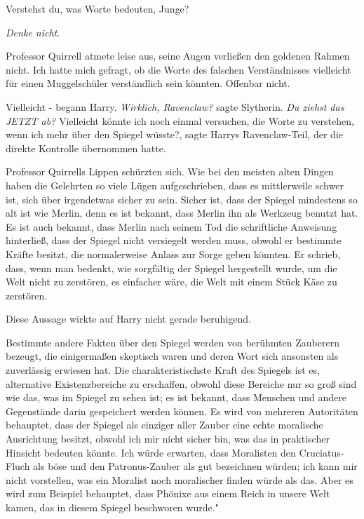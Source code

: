 \glqq{}Verstehst du, was Worte bedeuten, Junge?\grqq{}

\glqq{}\emph{Denke nicht}.\grqq{}

Professor Quirrell atmete leise aus, seine Augen verließen den goldenen Rahmen
nicht. \glqq{}Ich hatte mich gefragt, ob die Worte des falschen Verständnisses
vielleicht für einen Muggelschüler verständlich sein könnten. Offenbar
nicht.\grqq{}

\glqq{}Vielleicht -\grqq{} begann Harry. \emph{Wirklich, Ravenclaw?} sagte
Slytherin. \emph{Du ziehst das JETZT ab?} \glqq{}Vielleicht könnte ich noch
einmal versuchen, die Worte zu verstehen, wenn ich mehr über den Spiegel
wüsste?\grqq{}, sagte Harrys Ravenclaw-Teil, der die direkte Kontrolle
übernommen hatte.

Professor Quirrells Lippen schürzten sich. \glqq{}Wie bei den meisten alten
Dingen haben die Gelehrten so viele Lügen aufgeschrieben, dass es mittlerweile
schwer ist, sich über irgendetwas sicher zu sein. Sicher ist, dass der Spiegel
mindestens so alt ist wie Merlin, denn es ist bekannt, dass Merlin ihn als
Werkzeug benutzt hat. Es ist auch bekannt, dass Merlin nach seinem Tod die
schriftliche Anweisung hinterließ, dass der Spiegel nicht versiegelt werden
muss, obwohl er bestimmte Kräfte besitzt, die normalerweise Anlass zur Sorge
geben könnten. Er schrieb, dass, wenn man bedenkt, wie sorgfältig der Spiegel
hergestellt wurde, um die Welt nicht zu zerstören, es einfacher wäre, die Welt
mit einem Stück Käse zu zerstören.\grqq{}

Diese Aussage wirkte auf Harry nicht gerade beruhigend.

\glqq{}Bestimmte andere Fakten über den Spiegel werden von berühmten Zauberern
bezeugt, die einigermaßen skeptisch waren und deren Wort sich ansonsten als
zuverlässig erwiesen hat. Die charakteristischste Kraft des Spiegels ist es,
alternative Existenzbereiche zu erschaffen, obwohl diese Bereiche nur so groß
sind wie das, was im Spiegel zu sehen ist; es ist bekannt, dass Menschen und
andere Gegenstände darin gespeichert werden können. Es wird von mehreren
Autoritäten behauptet, dass der Spiegel als einziger aller Zauber eine echte
moralische Ausrichtung besitzt, obwohl ich mir nicht sicher bin, was das in
praktischer Hinsicht bedeuten könnte. Ich würde erwarten, dass Moralisten den
Cruciatus-Fluch als \glqq{}böse\grqq{} und den Patronus-Zauber als \glqq{}
gut\grqq{} bezeichnen würden; ich kann mir nicht vorstellen, was ein Moralist
noch moralischer finden würde als das. Aber es wird zum Beispiel behauptet, dass
Phönixe aus einem Reich in unsere Welt kamen, das in diesem Spiegel beschworen
wurde."

